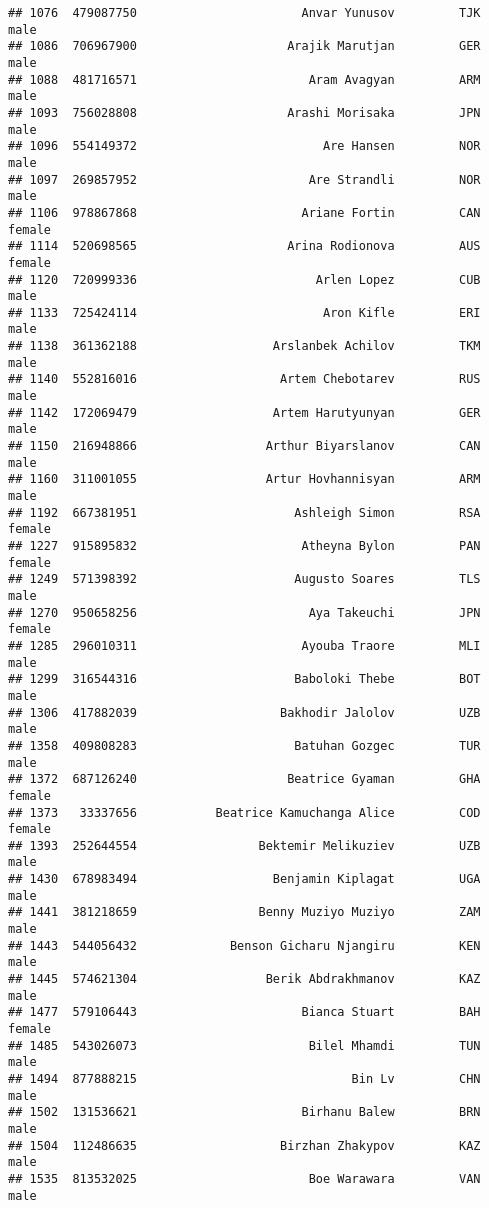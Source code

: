 \documentclass[]{article}
\begin{document}
\begin{verbatim}
## 1076  479087750                       Anvar Yunusov         TJK   male
## 1086  706967900                     Arajik Marutjan         GER   male
## 1088  481716571                        Aram Avagyan         ARM   male
## 1093  756028808                     Arashi Morisaka         JPN   male
## 1096  554149372                          Are Hansen         NOR   male
## 1097  269857952                        Are Strandli         NOR   male
## 1106  978867868                       Ariane Fortin         CAN female
## 1114  520698565                     Arina Rodionova         AUS female
## 1120  720999336                         Arlen Lopez         CUB   male
## 1133  725424114                          Aron Kifle         ERI   male
## 1138  361362188                   Arslanbek Achilov         TKM   male
## 1140  552816016                    Artem Chebotarev         RUS   male
## 1142  172069479                   Artem Harutyunyan         GER   male
## 1150  216948866                  Arthur Biyarslanov         CAN   male
## 1160  311001055                  Artur Hovhannisyan         ARM   male
## 1192  667381951                      Ashleigh Simon         RSA female
## 1227  915895832                       Atheyna Bylon         PAN female
## 1249  571398392                      Augusto Soares         TLS   male
## 1270  950658256                        Aya Takeuchi         JPN female
## 1285  296010311                       Ayouba Traore         MLI   male
## 1299  316544316                      Baboloki Thebe         BOT   male
## 1306  417882039                    Bakhodir Jalolov         UZB   male
## 1358  409808283                      Batuhan Gozgec         TUR   male
## 1372  687126240                     Beatrice Gyaman         GHA female
## 1373   33337656           Beatrice Kamuchanga Alice         COD female
## 1393  252644554                 Bektemir Melikuziev         UZB   male
## 1430  678983494                   Benjamin Kiplagat         UGA   male
## 1441  381218659                 Benny Muziyo Muziyo         ZAM   male
## 1443  544056432             Benson Gicharu Njangiru         KEN   male
## 1445  574621304                  Berik Abdrakhmanov         KAZ   male
## 1477  579106443                       Bianca Stuart         BAH female
## 1485  543026073                        Bilel Mhamdi         TUN   male
## 1494  877888215                              Bin Lv         CHN   male
## 1502  131536621                       Birhanu Balew         BRN   male
## 1504  112486635                    Birzhan Zhakypov         KAZ   male
## 1535  813532025                        Boe Warawara         VAN   male

\end{verbatim}
\end{document}
